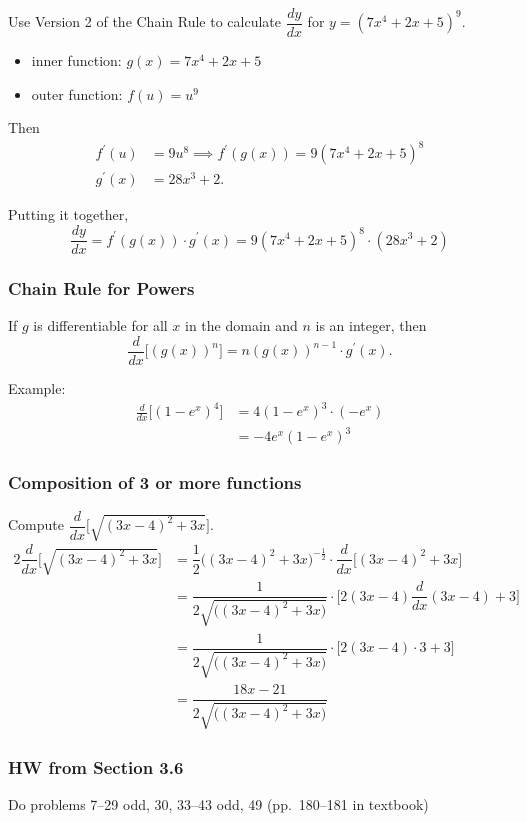 \documentclass[14pt]{beamer}
\begin{document}
\begin{frame}
\footnotesize
Use Version 2 of the Chain Rule to calculate $\dfrac{dy}{dx}$ for $y=(7x^4+2x+5)^9.$
\begin{itemize}
\item inner function: $g(x)=7x^4+2x+5$ 
\item outer function: $f(u)=u^9$
\end{itemize}
Then
\begin{align*}
f^{\prime}(u) &= 9u^8 \implies f^{\prime}(g(x))=9(7x^4+2x+5)^8 \\
g^{\prime}(x) &=28x^3+2.
\end{align*}

Putting it together,
$$\frac{dy}{dx}=f^{\prime}(g(x)) \cdot g^{\prime}(x) = 9(7x^4+2x+5)^8 \cdot (28x^3+2)$$
\end{frame}

\begin{frame}
\frametitle{Chain Rule for Powers}
\small
If $g$ is differentiable for all $x$ in the domain and $n$ is an integer, then
$$\frac{d}{dx} \bigg[\left(g(x)\right)^n \bigg]=n(g(x))^{n-1} \cdot g^{\prime}(x).$$

\vspace{1pc}
Example:
\begin{align*}
\frac{d}{dx} \bigg[ (1-e^x)^4 \bigg] &= 4(1-e^x)^3 \cdot (-e^x) \\
 &= -4e^x (1-e^x)^3
\end{align*}
\end{frame}

\begin{frame}[t]
\frametitle{Composition of 3 or more functions}
\footnotesize
Compute $\dfrac{d}{dx} \bigg[ \sqrt{(3x-4)^2 + 3x} \bigg]$.
\begin{alignat*}{2}
\dfrac{d}{dx} \bigg[ \sqrt{(3x-4)^2 + 3x} \bigg] &= \dfrac{1}{2} \big( (3x-4)^2 + 3x \big)^{-\frac{1}{2}} \cdot \dfrac{d}{dx} \big[ (3x-4)^2 + 3x \big] \\
&= \dfrac{1}{2 \sqrt{ \big( (3x-4)^2 + 3x \big)}} \cdot \bigg[ 2(3x-4) \dfrac{d}{dx}(3x-4)  + 3 \bigg] \\
&= \dfrac{1}{2 \sqrt{ \big( (3x-4)^2 + 3x \big)}} \cdot \big[ 2(3x-4) \cdot 3 + 3 \big] \\
&= \dfrac{18x-21}{2 \sqrt{ \big( (3x-4)^2 + 3x \big)}} 
\end{alignat*}
\end{frame}

\begin{frame}
\frametitle{HW from Section 3.6}
Do problems 7--29 odd, 30, 33--43 odd, 49 (pp.\ 180--181 in textbook)
\end{frame}
\end{document}
